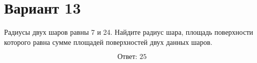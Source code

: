 \documentclass[12pt,a4paper]{article}
\begin{document}
\section*{Вариант 13}

Радиусы двух шаров равны 7 и 24. Найдите радиус шара, площадь поверхности которого равна сумме площадей поверхностей двух данных шаров.

\begin{center}
\end{center}

\[
\boxed{\text{Ответ: }25}
\]
\end{document}
